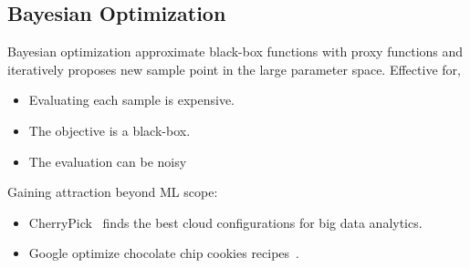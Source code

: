 \subsection{Bayesian Optimization}
\label{sec:bo}

Bayesian optimization approximate black-box functions with proxy functions and
iteratively proposes new sample point in the large parameter space. Effective
for,

\begin{itemize}
\item Evaluating each sample is expensive.
\item The objective is a black-box.
\item The evaluation can be noisy
\end{itemize}

Gaining attraction beyond ML scope:

\begin{itemize}
\item CherryPick~\cite{alipourfard2017cherrypick} finds the best cloud
  configurations for big data analytics.
\item Google optimize chocolate chip cookies recipes~\cite{solnik2017bayesian}.
\end{itemize}

